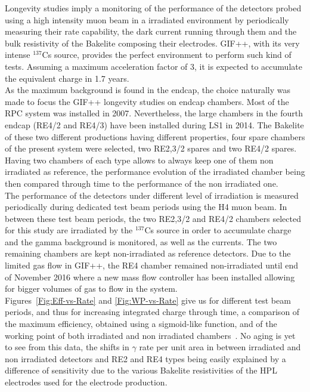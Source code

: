     Longevity studies imply a monitoring of the performance of the detectors probed using a high intensity muon beam in a irradiated environment by periodically measuring their rate capability, the dark current running through them and the bulk resistivity of the Bakelite composing their electrodes. GIF++, with its very intense $^{137}$Cs source, provides the perfect environment to perform such kind of tests. Assuming a maximum acceleration factor of 3, it is expected to accumulate the equivalent charge in 1.7 years.\\
    As the maximum background is found in the endcap, the choice naturally was made to focus the GIF++ longevity studies on endcap chambers. Most of the RPC system was installed in 2007. Nevertheless, the large chambers in the fourth endcap (RE4/2 and RE4/3) have been installed during LS1 in 2014. The Bakelite of these two different productions having different properties, four spare chambers of the present system were selected, two RE2,3/2 spares and two RE4/2 spares. Having two chambers of each type allows to always keep one of them non irradiated as reference, the performance evolution of the irradiated chamber being then compared through time to the performance of the non irradiated one.\\
    The performance of the detectors under different level of irradiation is measured periodically during dedicated test beam periods using the H4 muon beam. In between these test beam periods, the two RE2,3/2 and RE4/2 chambers selected for this study are irradiated by the $^{137}$Cs source in order to accumulate charge and the gamma background is monitored, as well as the currents. The two remaining chambers are kept non-irradiated as reference detectors. Due to the limited gas flow in GIF++, the RE4 chamber remained non-irradiated until end of November 2016 where a new mass flow controller has been installed allowing for bigger volumes of gas to flow in the system.\\
     Figures~\ref{Fig:Eff-vs-Rate} and \ref{Fig:WP-vs-Rate} give us for different test beam periods, and thus for increasing integrated charge through time, a comparison of the maximum efficiency, obtained using a sigmoid-like function, and of the working point of both irradiated and non irradiated chambers~\cite{SIGMOID2005}. No aging is yet to see from this data, the shifts in $\gamma$ rate per unit area  in between irradiated and non irradiated detectors and RE2 and RE4 types being easily explained by a difference of sensitivity due to the various Bakelite resistivities of the HPL electrodes used for the electrode production.\\
